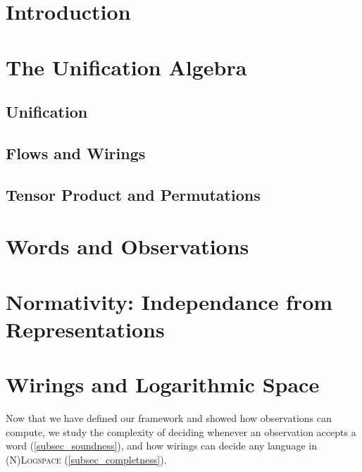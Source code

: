 
\section*{Introduction}


\section{The Unification Algebra}\label{sec_unification}
	\vspace{-1mm}
	\subsection{Unification}
	
	\subsection{Flows and Wirings}
	
	\subsection{Tensor Product and Permutations}\label{permutation}
	

\section{Words and Observations}\label{sec_words}
	
	
	
\section{Normativity: Independance from Representations}\label{sec_normativity}
	

\section{Wirings and Logarithmic Space}\label{sec_logspace}
	Now that we have defined our framework and showed how observations can compute, we study the complexity of deciding whenever an observation accepts a word (\ref{subsec_soundness}), and how wirings can decide any language in \textsc{(N)Logspace} (\ref{subsec_completness}).
